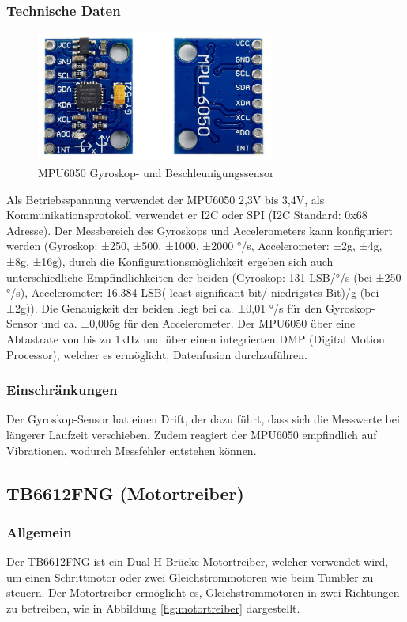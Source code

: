 \subsubsection{Technische Daten}
\begin{figure}[H]
    \centering
    \includegraphics[width=0.7\textwidth]{img/Hardware/MPU6050.png}
    \caption{MPU6050 Gyroskop- und Beschleunigungssensor}
    \label{fig:mpu6050}
\end{figure}
Als Betriebsspannung verwendet der MPU6050 2,3V bis 3,4V,
als Kommunikationsprotokoll verwendet er I2C oder SPI (I2C Standard: 0x68 Adresse).
%
Der Messbereich des Gyroskops und Accelerometers kann konfiguriert werden
(Gyroskop:  ±250, ±500, ±1000, ±2000 °/s, Accelerometer: ±2g, ±4g, ±8g, ±16g),
durch die Konfigurationsmöglichkeit ergeben sich auch unterschiedliche Empfindlichkeiten der beiden
(Gyroskop: 131 LSB/°/s (bei ±250 °/s),
Accelerometer: 16.384 LSB( least significant bit/ niedrigstes Bit)/g (bei ±2g)).
%
Die Genauigkeit der beiden liegt bei ca. ±0,01 °/s für den Gyroskop-Sensor und ca. ±0,005g für den Accelerometer.
%
Der MPU6050 über eine Abtastrate von bis zu 1kHz und über einen integrierten DMP (Digital Motion Processor),
welcher es ermöglicht, Datenfusion durchzuführen.
%
\subsubsection{Einschränkungen}
Der Gyroskop-Sensor hat einen Drift,
der dazu führt, dass sich die Messwerte bei längerer Laufzeit verschieben.
%
Zudem reagiert der MPU6050 empfindlich auf Vibrationen,
wodurch Messfehler entstehen können.
%
\subsection{TB6612FNG (Motortreiber)}
%
\subsubsection{Allgemein}
Der TB6612FNG ist ein Dual-H-Brücke-Motortreiber,
welcher verwendet wird,
um einen Schrittmotor oder zwei Gleichstrommotoren wie beim Tumbler zu steuern.
%
Der Motortreiber ermöglicht es,
Gleichstrommotoren in zwei Richtungen zu betreiben,
wie in Abbildung \ref{fig:motortreiber} dargestellt.
%
